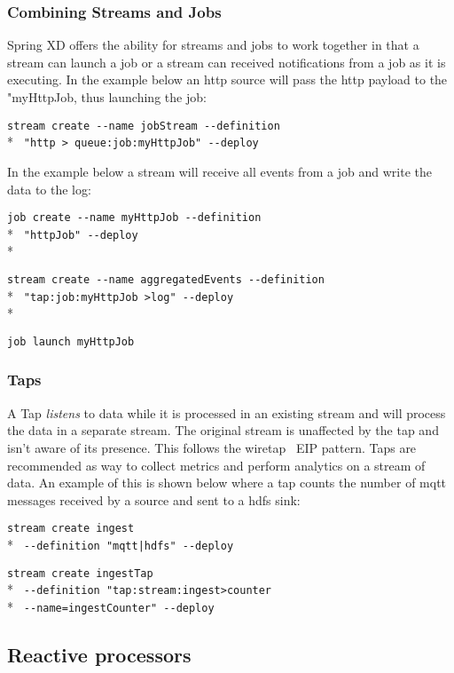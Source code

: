 \subsubsection {Combining Streams and Jobs}

Spring XD offers the ability for streams and jobs to work together in that
a stream can launch a job or a stream can received notifications from a job
as it is executing.  In the example below an http source will pass the http
payload to the "myHttpJob, thus launching the job:

\verb;stream create --name jobStream --definition ;\\*
\verb; "http > queue:job:myHttpJob" --deploy;

In the example below a stream will receive all events from a job and write
the data to the log:

\verb;job create --name myHttpJob --definition;\\*
\verb; "httpJob" --deploy;\\*

\verb;stream create --name aggregatedEvents --definition;\\*
\verb; "tap:job:myHttpJob >log" --deploy;\\*

\verb;job launch myHttpJob;

\subsubsection {Taps}

A Tap \emph{listens} to data while it is processed in an existing
stream and will process the data in a separate stream. The original stream is 
unaffected by the tap and isn't aware of its presence.  This follows the 
wiretap~\cite{wiretap} EIP pattern.  Taps are recommended as way to collect 
metrics and perform analytics on a stream of data. An example of this is shown
below where a tap counts the number of mqtt messages received by a source 
and sent to a hdfs sink:

\verb;stream create ingest;\\* 
\verb; --definition "mqtt|hdfs" --deploy;

\verb;stream create ingestTap;\\*
\verb; --definition "tap:stream:ingest>counter;\\*
\verb; --name=ingestCounter" --deploy;

\subsection {Reactive processors}


